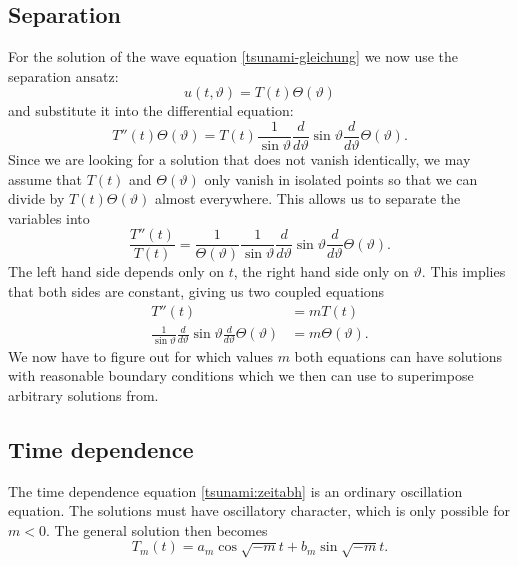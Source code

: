 \subsection{Separation}
For the solution of the wave equation \eqref{tsunami-gleichung}
we now use the separation ansatz:
\[
u(t,\vartheta)=T(t)\Theta(\vartheta)
\]
and substitute it into the differential equation:
\[
T''(t)\Theta(\vartheta)=
T(t)
\frac1{\sin\vartheta}
\frac{d}{d\vartheta}
\sin\vartheta
\frac{d}{d\vartheta}\Theta(\vartheta).
\]
Since we are looking for a solution that does not vanish identically,
we may assume that $T(t)$ and $\Theta(\vartheta)$ only vanish in isolated
points so that we can divide by $T(t)\Theta(\vartheta)$ almost everywhere.
This allows us to separate the variables into
\begin{equation}
\frac{T''(t)}{T(t)}
=
\frac1{\Theta(\vartheta)}
\frac1{\sin\vartheta}
\frac{d}{d\vartheta}
\sin\vartheta
\frac{d}{d\vartheta}\Theta(\vartheta).
\label{tsunami-separiert}
\end{equation}
The left hand side depends only on $t$, the right hand side only on
$\vartheta$.
This implies that both sides are constant, giving us two coupled equations
\begin{align}
T''(t)&=mT(t)
\label{tsunami:zeitabh}
\\
\frac1{\sin\vartheta}
\frac{d}{d\vartheta}
\sin\vartheta
\frac{d}{d\vartheta}\Theta(\vartheta)
&=m\Theta(\vartheta).
\label{tsunami:winkelabh}
\end{align}
We now have to figure out for which values $m$ both equations
can have solutions with reasonable boundary conditions which we
then can use to superimpose arbitrary solutions from.

\subsection{Time dependence}
The time dependence equation \eqref{tsunami:zeitabh} is an ordinary
oscillation equation.
The solutions must have oscillatory character, which is only possible
for $m<0$.
The general solution then becomes
\[
T_m(t)=a_m\cos\sqrt{-m}t+b_m\sin\sqrt{-m}t.
\]

